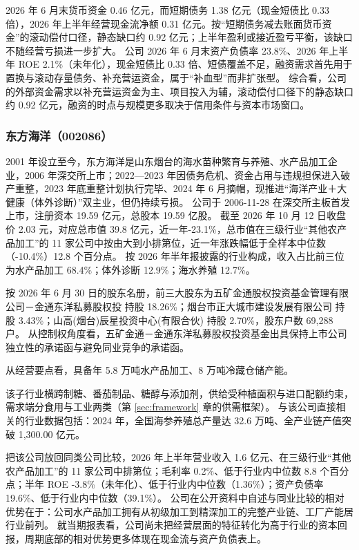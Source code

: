  2026 年 6 月末货币资金 0.46 亿元，而短期债务 1.38 亿元（现金短债比 0.33 倍），2026 年上半年经营现金流净额 0.31 亿元。按“短期债务减去账面货币资金”的滚动偿付口径，静态缺口约 0.92 亿元；上半年盈利或接近盈亏平衡，该缺口不随经营亏损进一步扩大。 公司 2026 年 6 月末资产负债率 23.8\%、2026 年上半年 ROE 2.1\%（未年化），现金短债比 0.33 倍、短债覆盖不足，融资需求首先用于置换与滚动存量债务、补充营运资金，属于“补血型”而非扩张型。 综合看，公司的外部资金需求以补充营运资金为主、项目投入为辅，滚动偿付口径下的静态缺口约 0.92 亿元，融资的时点与规模更多取决于信用条件与资本市场窗口。




\subsubsection{东方海洋（002086）}
\label{co:002086}

 2001 年设立至今，东方海洋是山东烟台的海水苗种繁育与养殖、水产品加工企业，2006 年深交所上市；2022—2023 年因债务危机、资金占用与违规担保进入破产重整，2023 年底重整计划执行完毕、2024 年 6 月摘帽，现推进“海洋产业＋大健康（体外诊断）”双主业，但仍持续亏损。 公司于 2006-11-28 在深交所主板首发上市，注册资本 19.59 亿元，总股本 19.59 亿股。 截至 2026 年 10 月 12 日收盘价 2.03 元，对应总市值 39.8 亿元，近一年-23.1\%，总市值在三级行业“其他农产品加工”的 11 家公司中按由大到小排第位，近一年涨跌幅低于全样本中位数（-10.4\%）12.8 个百分点。 按 2026 年半年报披露的行业构成，收入占比前三位为水产品加工 68.4\%；体外诊断 12.9\%；海水养殖 12.7\%。

 按 2026 年 6 月 30 日的股东名册，前三大股东为五矿金通股权投资基金管理有限公司－金通东洋私募股权投 持股 18.26\%；烟台市正大城市建设发展有限公司 持股 3.43\%；山高(烟台)辰星投资中心(有限合伙) 持股 2.70\%，股东户数 69,288 户。 从控制权角度看，五矿金通－金通东洋私募股权投资基金出具保持上市公司独立性的承诺函与避免同业竞争的承诺函。

 从经营要点看，具备年 5.8 万吨水产品加工、8 万吨冷藏仓储产能。

 该子行业横跨制糖、番茄制品、糖醇与添加剂，供给受种植面积与进口配额约束，需求端分食用与工业两类（第 \ref{sec:framework} 章的供需框架）。 与该公司直接相关的行业数据包括：2024 年，全国海参养殖总产量达 32.6 万吨、全产业链产值突破 1,300.00 亿元。

 把该公司放回同类公司比较，2026 年上半年营业收入 1.6 亿元、在三级行业“其他农产品加工”的 11 家公司中排第位；毛利率 0.2\%、低于行业内中位数 8.8 个百分点；半年 ROE -3.8\%（未年化）、低于行业内中位数（1.36\%）；资产负债率 19.6\%、低于行业内中位数（39.1\%）。 公司在公开资料中自述与同业比较的相对优势在于：公司水产品加工拥有从初级加工到精深加工的完整产业链、工厂产能居行业前列。 就当期报表看，公司尚未把经营层面的特征转化为高于行业的资本回报，周期底部的相对优势更多体现在现金流与资产负债表上。

